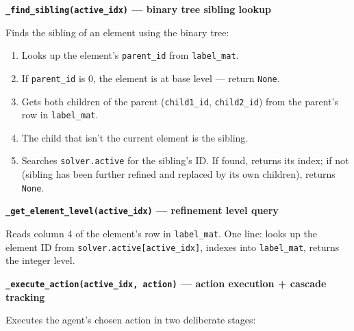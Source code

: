 \documentclass[11pt]{article}
\newcommand{\method}[1]{\textcolor{codeblue}{\texttt{#1}}}
\begin{document}
\vspace{0.3cm}

\noindent\textbf{\method{\_find\_sibling(active\_idx)} \textnormal{--- binary tree sibling lookup}}

\vspace{0.1cm}
\noindent Finds the sibling of an element using the binary tree:
\begin{enumerate}[leftmargin=1.5em, itemsep=2pt]
    \item Looks up the element's \texttt{parent\_id} from \method{label\_mat}.
    \item If \texttt{parent\_id} is 0, the element is at base level --- return \texttt{None}.
    \item Gets both children of the parent (\texttt{child1\_id}, \texttt{child2\_id}) from the parent's row in \method{label\_mat}.
    \item The child that isn't the current element is the sibling.
    \item Searches \method{solver.active} for the sibling's ID. If found, returns its index; if not (sibling has been further refined and replaced by its own children), returns \texttt{None}.
\end{enumerate}

\vspace{0.3cm}

\noindent\textbf{\method{\_get\_element\_level(active\_idx)} \textnormal{--- refinement level query}}

\vspace{0.1cm}
\noindent Reads column 4 of the element's row in \method{label\_mat}. One line: looks up the element ID from \method{solver.active[active\_idx]}, indexes into \method{label\_mat}, returns the integer level.

\vspace{0.3cm}

\noindent\textbf{\method{\_execute\_action(active\_idx, action)} \textnormal{--- action execution + cascade tracking}}

\vspace{0.1cm}
\noindent Executes the agent's chosen action in two deliberate stages:
\end{document}
